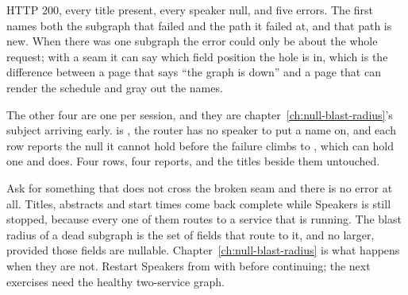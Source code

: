 %
HTTP 200, every title present, every speaker null, and five errors. The first
names both the subgraph that failed and the path it failed at, and that path
is new. When there was one subgraph the error could only be about the whole
request; with a seam it can say which field position the hole is in, which is
the difference between a page that says \enquote{the graph is down} and a page
that can render the schedule and gray out the names.

%
The other four are one per session, and they are
chapter~\ref{ch:null-blast-radius}'s subject arriving early.
 is , the router has no speaker to put a name
on, and each row reports the null it cannot hold before the failure climbs to
, which can hold one and does. Four rows, four reports, and the
titles beside them untouched.

%
Ask for something that does not cross the broken seam and there is no error at
all. Titles, abstracts and start times come back complete while Speakers is
still stopped, because every one of them routes to a service that is running.
The blast radius of a dead subgraph is the set of fields that route to it, and
no larger, provided those fields are nullable.
Chapter~\ref{ch:null-blast-radius} is what happens when they are not.
Restart Speakers from  with  before
continuing; the next exercises need the healthy two-service graph.
%
